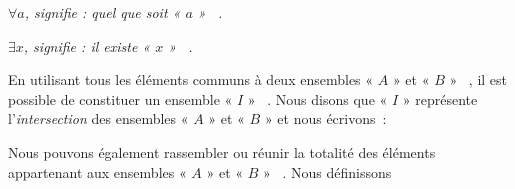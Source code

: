 \medskip

\begin{center}
\textit{$\forall a$, signifie : quel que soit « $a$ » ~.}

\medskip

\textit{$\exists x$, signifie : il existe « $x$ » ~.}  
\end{center}

\medskip

En utilisant tous les éléments communs à deux ensembles « $A$ » et
« $B$ » ~, il est possible de constituer un ensemble « $I$ » ~.
Nous disons que « $I$ » représente l'\textit{intersection} des
ensembles « $A$ » et « $B$ » et nous écrivons~:
\medskip
\begin{center}
\end{center}
\medskip
\begin{center}
\end{center}
\medskip
Nous pouvons également rassembler ou réunir la totalité des éléments
appartenant aux ensembles « $A$ » et « $B$ » ~. Nous définissons
